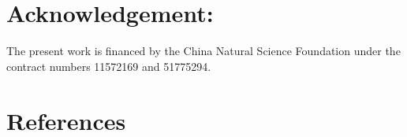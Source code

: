\documentclass[preprint,5p,twocolumn,10pt,sort&compress]{elsarticle}
\begin{document}
\section*{Acknowledgement:} The present work is financed by the China Natural Science Foundation under the contract numbers 11572169 and 51775294.

\section*{References}

\end{document}
